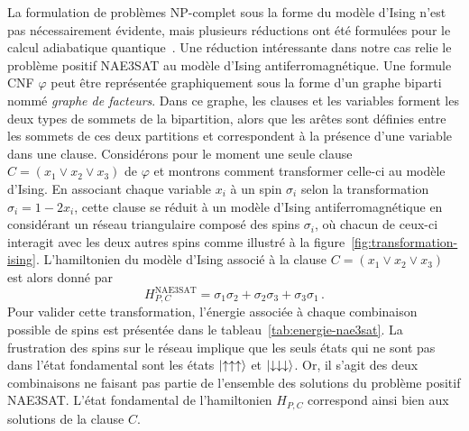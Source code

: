 La formulation de problèmes \textsf{NP}-complet sous la forme du modèle d'Ising n'est pas nécessairement évidente, mais plusieurs réductions ont été formulées pour le calcul adiabatique quantique~\cite{lucasIsingFormulationsMany2014,lodewijksMappingNPhardNPcomplete2020}. Une réduction intéressante dans notre cas relie le problème positif NAE3SAT au modèle d'Ising antiferromagnétique. Une formule CNF $\varphi$ peut être représentée graphiquement sous la forme d'un graphe biparti nommé \textit{graphe de facteurs}. Dans ce graphe, les clauses et les variables forment les deux types de sommets de la bipartition, alors que les arêtes sont définies entre les sommets de ces deux partitions et correspondent à la présence d'une variable dans une clause. Considérons pour le moment une seule clause $C = (x_{1} \lor x_{2} \lor x_{3})$ de $\varphi$ et montrons comment transformer celle-ci au modèle d'Ising. En associant chaque variable $x_{i}$ à un spin $\sigma_{i}$ selon la transformation $\sigma_{i} = 1 - 2x_{i}$, cette clause se réduit à un modèle d'Ising antiferromagnétique en considérant un réseau triangulaire composé des spins $\sigma_{i}$, où chacun de ceux-ci interagit avec les deux autres spins comme illustré à la figure~\ref{fig:transformation-ising}. L'hamiltonien du modèle d'Ising associé à la clause $C = (x_{1} \lor x_{2} \lor x_{3})$ est alors donné par
\begin{equation}
    H_{P, C}^{\text{NAE3SAT}} = \sigma_{1}\sigma_{2} + \sigma_{2}\sigma_{3} + \sigma_{3}\sigma_{1} \,.
\end{equation}
Pour valider cette transformation, l'énergie associée à chaque combinaison possible de spins est présentée dans le tableau~\ref{tab:energie-nae3sat}. La frustration des spins sur le réseau implique que les seuls états qui ne sont pas dans l'état fondamental sont les états $\ket{\uparrow \uparrow \uparrow}$ et $\ket{\downarrow \downarrow \downarrow}$. Or, il s'agit des deux combinaisons ne faisant pas partie de l'ensemble des solutions du problème positif NAE3SAT. L'état fondamental de l'hamiltonien $H_{P, C}$ correspond ainsi bien aux solutions de la clause $C$.


